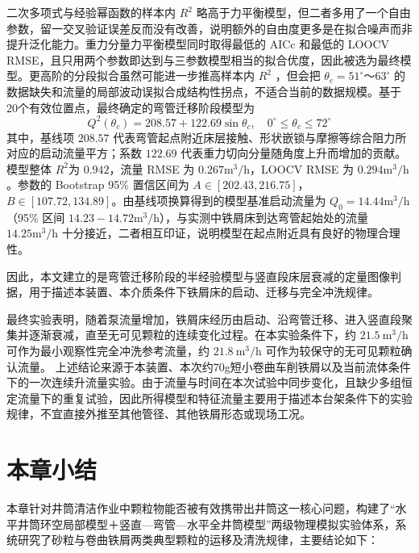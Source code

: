 二次多项式与经验幂函数的样本内 $R^2$ 略高于力平衡模型，但二者多用了一个自由参数，留一交叉验证误差反而没有改善，说明额外的自由度更多是在拟合噪声而非提升泛化能力。重力分量力平衡模型同时取得最低的 AICc 和最低的 LOOCV RMSE，且只用两个参数即达到与三参数模型相当的拟合优度，因此被选为最终模型。更高阶的分段拟合虽然可能进一步推高样本内 $R^2$ ，但会把 $\theta_c=51^\circ$～$63^\circ$ 的数据缺失和流量的局部波动误拟合成结构性拐点，不适合当前的数据规模。基于 $20$个有效位置点，最终确定的弯管迁移阶段模型为
\begin{equation}
	Q^2(\theta_c) = 208.57 + 122.69\sin \theta_c, \quad 0^\circ \le \theta_c \le 72^\circ
	\label{eq:bend_model}
\end{equation}
其中，基线项 $208.57$ 代表弯管起点附近床层接触、形状嵌锁与摩擦等综合阻力所对应的启动流量平方；系数 $122.69$ 代表重力切向分量随角度上升而增加的贡献。模型整体 $R^2$为 $0.942$，流量 RMSE 为 $0.267 \mathrm{m^3/h}$，LOOCV RMSE 为 $0.294 \mathrm{m^3/h}$。参数的 Bootstrap 95\% 置信区间为 $A \in [202.43, 216.75]$，$B \in [107.72, 134.89]$。由基线项换算得到的模型基准启动流量为 $Q_0 = 14.44 \mathrm{m^3/h}$（95\% 区间 $14.23-14.72 \mathrm{m^3/h}$），与实测中铁屑床到达弯管起始处的流量$14.25\mathrm{m^3/h}$ 十分接近，二者相互印证，说明模型在起点附近具有良好的物理合理性。

因此，本文建立的是弯管迁移阶段的半经验模型与竖直段床层衰减的定量图像判据，用于描述本装置、本介质条件下铁屑床的启动、迁移与完全冲洗规律。


最终实验表明，随着泵流量增加，铁屑床经历由启动、沿弯管迁移、进入竖直段聚集并逐渐衰减，直至无可见颗粒的连续变化过程。在本实验条件下，约 $21.5\ \mathrm{m^3/h}$ 可作为最小观察性完全冲洗参考流量，约 $21.8\ \mathrm{m^3/h}$ 可作为较保守的无可见颗粒确认流量。
上述结论来源于本装置、本次约70g短小卷曲车削铁屑以及当前流体条件下的一次连续升流量实验。由于流量与时间在本次试验中同步变化，且缺少多组恒定流量下的重复试验，因此所得模型和特征流量主要用于描述本台架条件下的实验规律，不宜直接外推至其他管径、其他铁屑形态或现场工况。


\section{本章小结}

本章针对井筒清洁作业中颗粒物能否被有效携带出井筒这一核心问题，构建了“水平井筒环空局部模型＋竖直—弯管—水平全井筒模型”两级物理模拟实验体系，系统研究了砂粒与卷曲铁屑两类典型颗粒的运移及清洗规律，主要结论如下：

